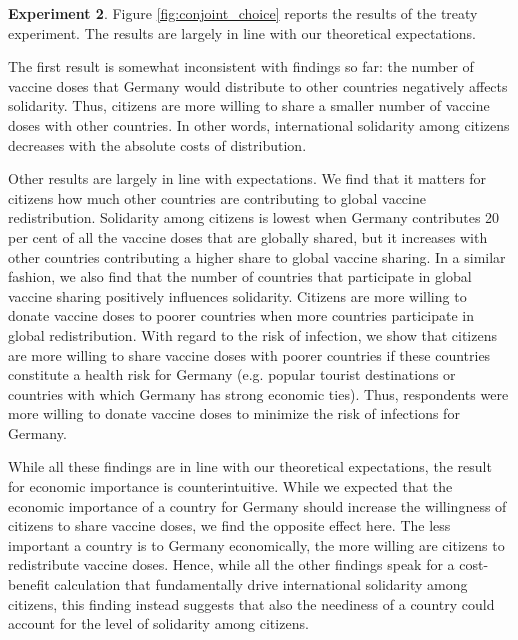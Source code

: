 \documentclass[12pt,oneside,smallheadings,chapterprefix=true]{article}
\begin{document}
\textbf{Experiment 2}. 
Figure \ref{fig:conjoint_choice} reports the results of the treaty experiment. The results are largely in line with our theoretical expectations. 

The first result is somewhat inconsistent with findings so far: the number of vaccine doses that Germany would distribute to other countries negatively affects solidarity. Thus, citizens are more willing to share a smaller number of vaccine doses with other countries. In other words, international solidarity among citizens decreases with the absolute costs of distribution. 

Other results are largely in line with expectations. We find that it matters for citizens how much other countries are contributing to global vaccine redistribution. Solidarity among citizens is lowest when Germany contributes 20 per cent of all the vaccine doses that are globally shared, but it increases with other countries contributing a higher share to global vaccine sharing. In a similar fashion, we also find that the number of countries that participate in global vaccine sharing positively influences solidarity. Citizens are more willing to donate vaccine doses to poorer countries when more countries participate in global redistribution. With regard to the risk of infection, we show that citizens are more willing to share vaccine doses with poorer countries if these countries constitute a health risk for Germany (e.g. popular tourist destinations or countries with which Germany has strong economic ties). Thus, respondents were more willing to donate vaccine doses to minimize the risk of infections for Germany. 

While all these findings are in line with our theoretical expectations, the result for economic importance is counterintuitive. While we expected that the economic importance of a country for Germany should increase the willingness of citizens to share vaccine doses, we find the opposite effect here. The less important a country is to Germany economically, the more willing are citizens to redistribute vaccine doses. Hence, while all the other findings speak for a cost-benefit calculation that fundamentally drive international solidarity among citizens, this finding instead suggests that also the neediness of a country could account for the level of solidarity among citizens. 
\end{document}
